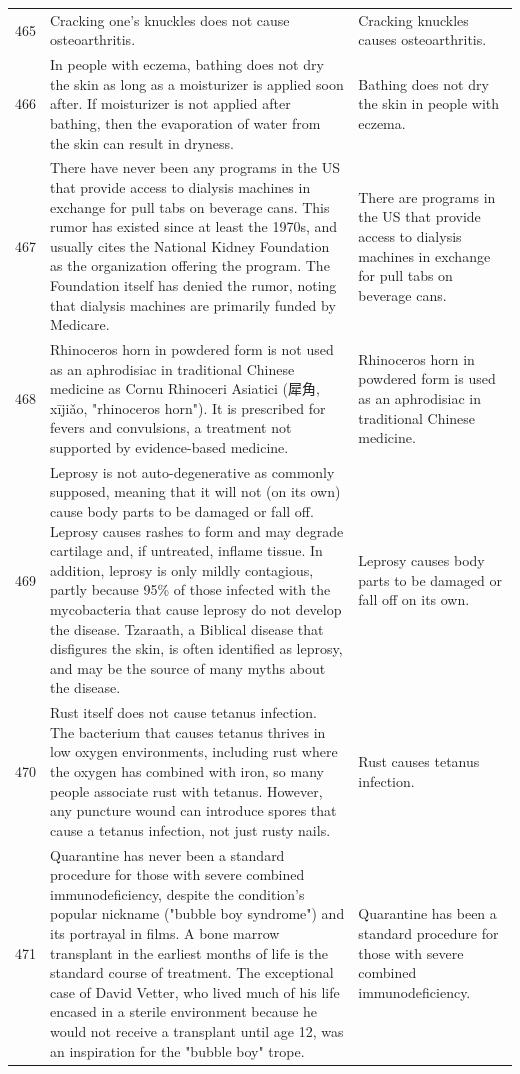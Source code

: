 \begin{tabular}{c|p{}|p{}}
465 & Cracking one's knuckles does not cause osteoarthritis. & Cracking knuckles causes osteoarthritis. \\
466 & In people with eczema, bathing does not dry the skin as long as a moisturizer is applied soon after. If moisturizer is not applied after bathing, then the evaporation of water from the skin can result in dryness. & Bathing does not dry the skin in people with eczema. \\
467 & There have never been any programs in the US that provide access to dialysis machines in exchange for pull tabs on beverage cans. This rumor has existed since at least the 1970s, and usually cites the National Kidney Foundation as the organization offering the program. The Foundation itself has denied the rumor, noting that dialysis machines are primarily funded by Medicare. & There are programs in the US that provide access to dialysis machines in exchange for pull tabs on beverage cans. \\
468 & Rhinoceros horn in powdered form is not used as an aphrodisiac in traditional Chinese medicine as Cornu Rhinoceri Asiatici (犀角, xījiǎo, "rhinoceros horn"). It is prescribed for fevers and convulsions, a treatment not supported by evidence-based medicine. & Rhinoceros horn in powdered form is used as an aphrodisiac in traditional Chinese medicine. \\
469 & Leprosy is not auto-degenerative as commonly supposed, meaning that it will not (on its own) cause body parts to be damaged or fall off. Leprosy causes rashes to form and may degrade cartilage and, if untreated, inflame tissue. In addition, leprosy is only mildly contagious, partly because 95\% of those infected with the mycobacteria that cause leprosy do not develop the disease. Tzaraath, a Biblical disease that disfigures the skin, is often identified as leprosy, and may be the source of many myths about the disease. & Leprosy causes body parts to be damaged or fall off on its own. \\
470 & Rust itself does not cause tetanus infection. The bacterium that causes tetanus thrives in low oxygen environments, including rust where the oxygen has combined with iron, so many people associate rust with tetanus. However, any puncture wound can introduce spores that cause a tetanus infection, not just rusty nails. & Rust causes tetanus infection. \\
471 & Quarantine has never been a standard procedure for those with severe combined immunodeficiency, despite the condition's popular nickname ("bubble boy syndrome") and its portrayal in films. A bone marrow transplant in the earliest months of life is the standard course of treatment. The exceptional case of David Vetter, who lived much of his life encased in a sterile environment because he would not receive a transplant until age 12, was an inspiration for the "bubble boy" trope. & Quarantine has been a standard procedure for those with severe combined immunodeficiency. \\

\end{tabular}
